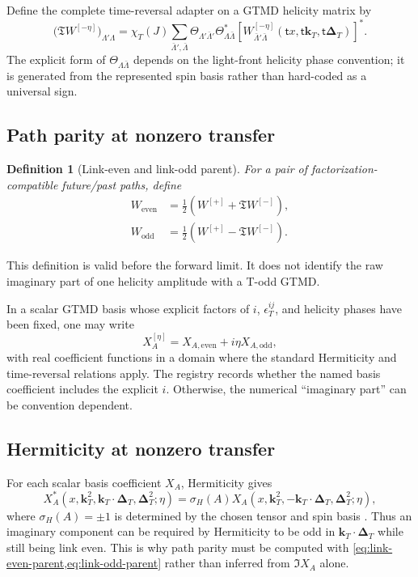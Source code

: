 \documentclass[11pt]{article}
\newtheorem{definition}{Definition}[section]
\newcommand{\kT}{\bm{k}_{T}}
\newcommand{\DT}{\bm{\Delta}_{T}}
\newcommand{\odd}{\mathrm{odd}}
\newcommand{\even}{\mathrm{even}}
\begin{document}
Define the complete time-reversal adapter on a GTMD helicity matrix by
\begin{equation}
 \bigl(\mathfrak T W^{[-\eta]}\bigr)_{\Lambda'\Lambda}
 =\chi_T(J)
 \sum_{\bar\Lambda',\bar\Lambda}
 \Theta_{\Lambda'\bar\Lambda'}
 \Theta_{\Lambda\bar\Lambda}^{*}
 \left[
 W_{\bar\Lambda'\bar\Lambda}^{[-\eta]}
 (\mathsf t x,\mathsf t\kT,\mathsf t\DT)
 \right]^*.
\label{eq:time-reversal-adapter}
\end{equation}
The explicit form of \(\Theta_{\Lambda\bar\Lambda}\) depends on the
light-front helicity phase convention; it is generated from the represented
spin basis rather than hard-coded as a universal sign.

\subsection{Path parity at nonzero transfer}

\begin{definition}[Link-even and link-odd parent]
\label{def:link-even-odd}
For a pair of factorization-compatible future/past paths, define
\begin{align}
 W_{\even}
 &=\frac12\left(W^{[+]}+\mathfrak T W^{[-]}\right),
\label{eq:link-even-parent}\\
 W_{\odd}
 &=\frac12\left(W^{[+]}-\mathfrak T W^{[-]}\right).
\label{eq:link-odd-parent}
\end{align}
\end{definition}
This definition is valid before the forward limit.  It does not identify the
raw imaginary part of one helicity amplitude with a T-odd GTMD.

In a scalar GTMD basis whose explicit factors of \(i\), \(\epsilon_T^{ij}\),
and helicity phases have been fixed, one may write
\begin{equation}
 X_A^{[\eta]}
 =X_{A,\even}+i\eta X_{A,\odd},
\label{eq:scalar-even-odd-decomposition}
\end{equation}
with real coefficient functions in a domain where the standard Hermiticity
and time-reversal relations apply.  The registry records whether the named
basis coefficient includes the explicit \(i\).  Otherwise, the numerical
``imaginary part'' can be convention dependent.

\subsection{Hermiticity at nonzero transfer}

For each scalar basis coefficient \(X_A\), Hermiticity gives
\begin{equation}
 X_A^*(x,\kT^2,\kT\!\cdot\!\DT,\DT^2;\eta)
 =\sigma_H(A)
 X_A(x,\kT^2,-\kT\!\cdot\!\DT,\DT^2;\eta),
\label{eq:gtmd-hermiticity-sign}
\end{equation}
where \(\sigma_H(A)=\pm1\) is determined by the chosen tensor and spin basis
\cite{Meissner2009}.  Thus an imaginary component can be required by
Hermiticity to be odd in \(\kT\cdot\DT\) while still being link even.  This is
why path parity must be computed with \cref{eq:link-even-parent,eq:link-odd-parent}
 rather than inferred from \(\Im X_A\) alone.
\end{document}
